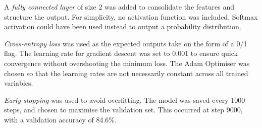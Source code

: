 \documentclass[a4paper,12pt]{article}
\begin{document}
A \textit{fully connected layer} of size 2 was added to consolidate the features and structure the output. For simplicity, no activation function was included. Softmax activation could have been used instead to output a probability distribution.

\textit{Cross-entropy loss} was used as the expected outputs take on the form of a 0/1 flag. The learning rate for gradient descent was set to 0.001 to ensure quick convergence without overshooting the minimum loss. The Adam Optimiser was chosen so that the learning rates are not necessarily constant across all trained variables.

\textit{Early stopping} was used to avoid overfitting. The model was saved every 1000 steps, and chosen to maximise the validation set. This occurred at step 9000, with a validation accuracy of 84.6\%.
\end{document}
